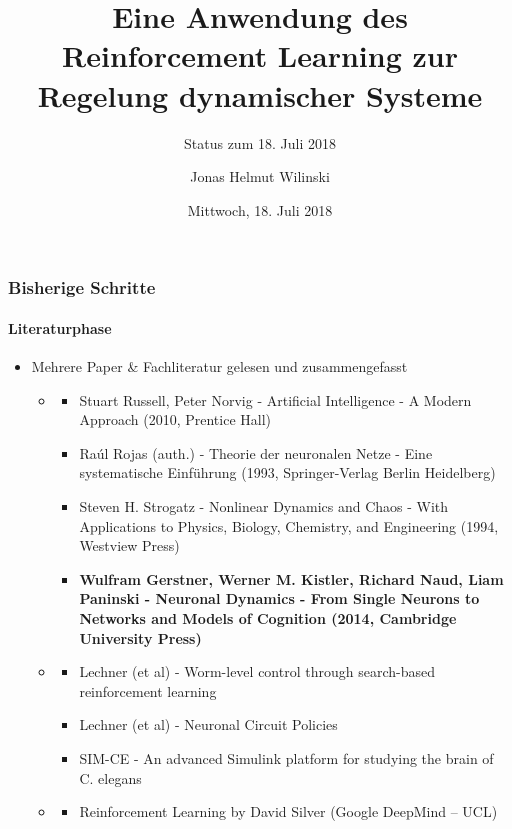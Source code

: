 \documentclass[10pt,t,aspectratio=1610]{beamer}
\title{Eine Anwendung des Reinforcement Learning zur Regelung dynamischer Systeme}
\subtitle{Status zum 18. Juli 2018}
\author[J. Wilinski]{Jonas Helmut Wilinski}
\institute[ACON]{Statusgespräch}
\date{Mittwoch, 18. Juli 2018}
\begin{document}

\begin{frame}[plain]
  \titlepage
\end{frame}


\begin{frame}
  \frametitle{Bisherige Schritte}
  \framesubtitle{Literaturphase}

  \begin{itemize}
  \item Mehrere Paper \& Fachliteratur gelesen und zusammengefasst
    \begin{itemize}
    \item {}
    	\begin{itemize}
    		\item Stuart Russell, Peter Norvig - Artificial Intelligence - A Modern Approach (2010, Prentice Hall)
    		\item Raúl Rojas (auth.) - Theorie der neuronalen Netze - Eine systematische Einführung (1993, Springer-Verlag Berlin Heidelberg)
    		\item Steven H. Strogatz - Nonlinear Dynamics and Chaos - With Applications to Physics, Biology, Chemistry, and Engineering  (1994, Westview Press)
    		\item \textbf{Wulfram Gerstner, Werner M. Kistler, Richard Naud, Liam Paninski - Neuronal Dynamics - From Single Neurons to Networks and Models of Cognition (2014, Cambridge University Press)
    		}
    	\end{itemize}
    \item {}
    	\begin{itemize}
    		\item Lechner (et al) - Worm-level control through search-based reinforcement learning
    		\item Lechner (et al) - Neuronal Circuit Policies
    		\item SIM-CE - An advanced Simulink platform for studying the brain of C. elegans
    	\end{itemize}
    \item {}
    	\begin{itemize}
    		\item Reinforcement Learning by David Silver (Google DeepMind – UCL)
    	\end{itemize}
    \end{itemize}
  \end{itemize}  
\end{frame}
\end{document}
